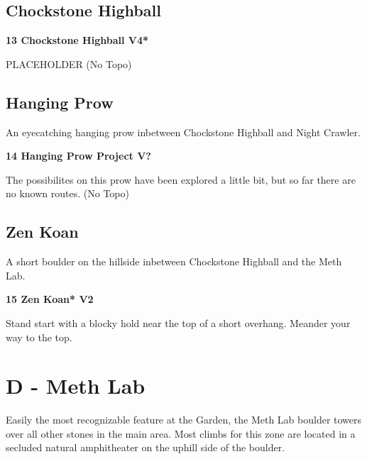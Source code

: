 \begin{multicols}{2}
		\subsection*{Chockstone Highball}\label{bf:Chockstone Highball}
			
			\label{rt:Chockstone Highball}
\colorbox{RoyalBlue!20}{
\parbox{0.95\linewidth}{
\textbf{
13 Chockstone Highball V4*  
}
}
}

			\begin{adjustwidth}{0.5cm}{}				
			PLACEHOLDER
				\newline (No Topo) 
			\end{adjustwidth}
		\subsection*{Hanging Prow}\label{bf:Hanging Prow}
		An eyecatching hanging prow inbetween Chockstone Highball and Night Crawler.\\
	
			\label{rt:Hanging Prow Project}
\colorbox{black!20}{
\parbox{0.95\linewidth}{
\textbf{
14 Hanging Prow Project V?  
}
}
}

			\begin{adjustwidth}{0.5cm}{}				
			The possibilites on this prow have been explored a little bit, but so far there are no known routes.
				\newline (No Topo) 
			\end{adjustwidth}
		\subsection*{Zen Koan}\label{bf:Zen Koan}
		A short boulder on the hillside inbetween Chockstone Highball and the Meth Lab.\\
	

			\label{rt:Zen Koan}
\colorbox{green!20}{
\parbox{0.95\linewidth}{
\textbf{
15 Zen Koan* V2  
}
}
}

			\begin{adjustwidth}{0.5cm}{}				
			Stand start with a blocky hold near the top of a short overhang. Meander your way to the top.
			\end{adjustwidth}
\newpage

		\section{D - Meth Lab}\label{sa:Meth Lab}
	Easily the most recognizable feature at the Garden, the Meth Lab boulder towers over all other stones in the main area. Most climbs for this zone are located in a secluded natural amphitheater on the uphill side of the boulder.\\


\end{multicols}

